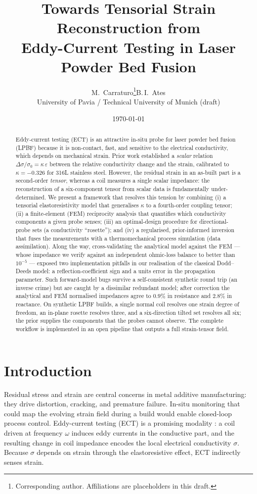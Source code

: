 \documentclass[11pt]{article}
\title{\textbf{Towards Tensorial Strain Reconstruction from\\
Eddy-Current Testing in Laser Powder Bed Fusion}}
\author{M.\ Carraturo\thanks{Corresponding author. Affiliations are placeholders
in this draft.}\quad B.\,I.\ Ates\\[2pt]
\small University of Pavia / Technical University of Munich (draft)}
\date{\today}
\newcommand{\dsig}{\Delta\sigma}
\begin{document}
\maketitle

\begin{abstract}
Eddy-current testing (ECT) is an attractive in-situ probe for laser powder bed
fusion (LPBF) because it is non-contact, fast, and sensitive to the electrical
conductivity, which depends on mechanical strain. Prior work established a
\emph{scalar} relation $\dsig/\sigma_0=\kappa\,\varepsilon$ between the relative
conductivity change and the strain, calibrated to $\kappa=-0.326$ for 316L
stainless steel. However, the residual strain in an as-built part is a
second-order \emph{tensor}, whereas a coil measures a single scalar impedance:
the reconstruction of a six-component tensor from scalar data is fundamentally
under-determined. We present a framework that resolves this tension by combining
(i) a tensorial elastoresistivity model that generalises $\kappa$ to a
fourth-order coupling tensor; (ii) a finite-element (FEM) reciprocity analysis
that quantifies which conductivity components a given probe senses; (iii) an
optimal-design procedure for directional-probe sets (a conductivity ``rosette'');
and (iv) a regularised, prior-informed inversion that fuses the measurements with
a thermomechanical process simulation (data assimilation). Along the way,
cross-validating the analytical model against the FEM --- whose impedance we
verify against an independent ohmic-loss balance to better than $10^{-5}$ ---
exposed two implementation pitfalls in our realisation of the classical
Dodd--Deeds model: a reflection-coefficient sign and a units error in the
propagation parameter. Such forward-model bugs survive a self-consistent
synthetic round trip (an inverse crime) but are caught by a dissimilar redundant
model; after correction the analytical and FEM normalised impedances agree to
$0.9\%$ in resistance and $2.8\%$ in reactance. On synthetic LPBF builds, a single normal coil
resolves one strain degree of freedom, an in-plane rosette resolves three, and a
six-direction tilted set resolves all six; the prior supplies the components that
the probes cannot observe. The complete workflow is implemented in an open
pipeline that outputs a full strain-tensor field.
\end{abstract}

\section{Introduction}
Residual stress and strain are central concerns in metal additive manufacturing:
they drive distortion, cracking, and premature failure. In-situ monitoring that
could map the evolving strain field during a build would enable closed-loop
process control. Eddy-current testing (ECT) is a promising modality
\cite{garcia2011}: a coil driven at frequency $\omega$ induces eddy currents in
the conductive part, and the resulting change in coil impedance encodes the local
electrical conductivity $\sigma$. Because $\sigma$ depends on strain through the
elastoresistive effect, ECT indirectly senses strain.
\end{document}
